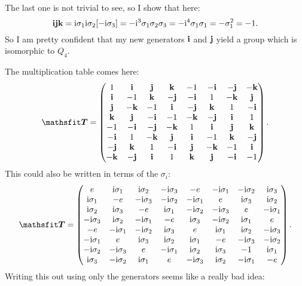 \documentclass[11pt, english, fleqn, DIV=15, headinclude, BCOR=1cm]{scrartcl}
\begin{document}
The last one is not trivial to see, so I show that here:
\[
    \mathbf i\mathbf j\mathbf k = \mathrm i\sigma_1 \mathrm i\sigma_2 [-\mathrm i\sigma_3] = - \mathrm i^3 \sigma_1\sigma_2\sigma_3 = - \mathrm i^4 \sigma_1\sigma_1
    = - \sigma_1^2 = -1.
\]
So I am pretty confident that my new generators $\mathbf i$ and $\mathbf j$ yield a group
which is isomorphic to $Q_4$.

The multiplication table comes here:
\[
    \tens T =
    \begin{pmatrix}
         1   &  \qi &  \qj &  \qk & -1   & -\qi & -\qj & -\qk \\
         \qi & -1   &  \qk & -\qj & -\qi &  1   & -\qk &  \qj \\
         \qj & -\qk & -1   &  \qi & -\qj &  \qk &  1   & -\qi \\
         \qk &  \qj & -\qi & -1   & -\qk & -\qj &  \qi &  1   \\
        -1   & -\qi & -\qj & -\qk &  1   &  \qi &  \qj &  \qk \\
        -\qi &  1   & -\qk &  \qj &  \qi & -1   &  \qk & -\qj \\
        -\qj &  \qk &  1   & -\qi &  \qj & -\qk & -1   &  \qi \\
        -\qk & -\qj &  \qi &  1   &  \qk &  \qj & -\qi & -1  
    \end{pmatrix}.
\]
This could also be written in terms of the $\sigma_i$:
\[
    \tens T =
    \begin{pmatrix}
         e   &  \iup\1 &  \iup\2 &  -\iup\3 & -e   & -\iup\1 & -\iup\2 & \iup\3 \\
         \iup\1 & -e   &  -\iup\3 & -\iup\2 & -\iup\1 &  e   & \iup\3 &  \iup\2 \\
         \iup\2 & \iup\3 & -e   &  \iup\1 & -\iup\2 &  -\iup\3 &  e   & -\iup\1 \\
         -\iup\3 &  \iup\2 & -\iup\1 & -e   & \iup\3 & -\iup\2 &  \iup\1 &  e   \\
        -e   & -\iup\1 & -\iup\2 & \iup\3 &  e   &  \iup\1 &  \iup\2 &  -\iup\3 \\
        -\iup\1 &  e   & \iup\3 &  \iup\2 &  \iup\1 & -e   &  -\iup\3 & -\iup\2 \\
        -\iup\2 &  -\iup\3 &  e   & -\iup\1 &  \iup\2 & \iup\3 & -1   &  \iup\1 \\
        \iup\3 & -\iup\2 &  \iup\1 &  e   &  -\iup\3 &  \iup\2 & -\iup\1 & -e  
    \end{pmatrix}.
\]
Writing this out using only the generators seems like a really bad idea:
\end{document}
